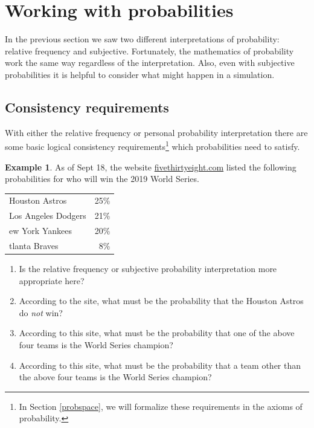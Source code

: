 \documentclass[
]{book}
\providecommand{\tightlist}{%
  \setlength{\itemsep}{0pt}\setlength{\parskip}{0pt}}
\theoremstyle{definition}
\theoremstyle{definition}
\newtheorem{example}{Example}[chapter]
\theoremstyle{definition}
\theoremstyle{remark}
\begin{document}
\hypertarget{consistency}{%
\section{Working with probabilities}\label{consistency}}

In the previous section we saw two different interpretations of probability: relative frequency and subjective. Fortunately, the mathematics of probability work the same way regardless of the interpretation. Also, even with subjective probabilities it is helpful to consider what might happen in a simulation.

\hypertarget{consistency-requirements}{%
\subsection{Consistency requirements}\label{consistency-requirements}}

With either the relative frequency or personal probability interpretation there are some basic logical consistency requirements\footnote{In Section \ref{probspace}, we will formalize these requirements in the axioms of probability.} which probabilities need to satisfy.

\begin{example}
\protect\hypertarget{exm:worldseries}{}{\label{exm:worldseries} }
As of Sept 18, the website \href{https://projects.fivethirtyeight.com/2019mlb-predictions/}{fivethirtyeight.com} listed the following probabilities for who will
win the 2019 World Series.
\end{example}

\begin{longtable}[]{@{}lr@{}}
\toprule
\endhead
Houston Astros & 25\%\tabularnewline
Los Angeles Dodgers & 21\%\tabularnewline
ew York Yankees & 20\%\tabularnewline
tlanta Braves & 8\%\tabularnewline
\bottomrule
\end{longtable}

\begin{enumerate}
\def\labelenumi{\arabic{enumi}.}
\tightlist
\item
  Is the relative frequency or subjective probability interpretation more appropriate here?
\item
  According to the site, what must be the probability that the Houston Astros do \emph{not} win?
\item
  According to this site, what must be the probability that one of the above four teams is the World Series champion?
\item
  According to this site, what must be the probability that a team other than the above four teams is the World Series champion?
\end{enumerate}
\end{document}

